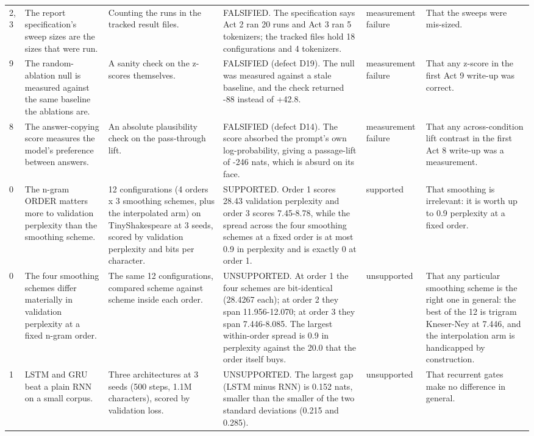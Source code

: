 {\begin{longtable}{L{0.9cm}L{2.8cm}L{2.7cm}L{3.0cm}L{1.9cm}L{2.1cm}}
2, 3 & The report specification's sweep sizes are the sizes that were run. & Counting the runs in the tracked result files. & FALSIFIED. The specification says Act 2 ran 20 runs and Act 3 ran 5 tokenizers; the tracked files hold 18 configurations and 4 tokenizers. & measurement failure & That the sweeps were mis-sized. \\
9 & The random-ablation null is measured against the same baseline the ablations are. & A sanity check on the z-scores themselves. & FALSIFIED (defect D19). The null was measured against a stale baseline, and the check returned -88 instead of +42.8. & measurement failure & That any z-score in the first Act 9 write-up was correct. \\
8 & The answer-copying score measures the model's preference between answers. & An absolute plausibility check on the pass-through lift. & FALSIFIED (defect D14). The score absorbed the prompt's own log-probability, giving a passage-lift of -246 nats, which is absurd on its face. & measurement failure & That any across-condition lift contrast in the first Act 8 write-up was a measurement. \\
0 & The n-gram ORDER matters more to validation perplexity than the smoothing scheme. & 12 configurations (4 orders x 3 smoothing schemes, plus the interpolated arm) on TinyShakespeare at 3 seeds, scored by validation perplexity and bits per character. & SUPPORTED. Order 1 scores 28.43 validation perplexity and order 3 scores 7.45-8.78, while the spread across the four smoothing schemes at a fixed order is at most 0.9 in perplexity and is exactly 0 at order 1. & supported & That smoothing is irrelevant: it is worth up to 0.9 perplexity at a fixed order. \\
0 & The four smoothing schemes differ materially in validation perplexity at a fixed n-gram order. & The same 12 configurations, compared scheme against scheme inside each order. & UNSUPPORTED. At order 1 the four schemes are bit-identical (28.4267 each); at order 2 they span 11.956-12.070; at order 3 they span 7.446-8.085. The largest within-order spread is 0.9 in perplexity against the 20.0 that the order itself buys. & unsupported & That any particular smoothing scheme is the right one in general: the best of the 12 is trigram Kneser-Ney at 7.446, and the interpolation arm is handicapped by construction. \\
1 & LSTM and GRU beat a plain RNN on a small corpus. & Three architectures at 3 seeds (500 steps, 1.1M characters), scored by validation loss. & UNSUPPORTED. The largest gap (LSTM minus RNN) is 0.152 nats, smaller than the smaller of the two standard deviations (0.215 and 0.285). & unsupported & That recurrent gates make no difference in general. \\

\end{longtable}}
